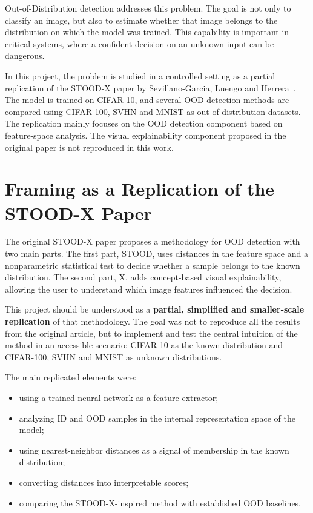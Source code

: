\documentclass[11pt,a4paper]{article}
\begin{document}
Out-of-Distribution detection addresses this problem.
The goal is not only to classify an image, but also to estimate whether that image belongs to the distribution on which the model was trained.
This capability is important in critical systems, where a confident decision on an unknown input can be dangerous.

In this project, the problem is studied in a controlled setting as a partial replication of the STOOD-X paper by Sevillano-Garcia, Luengo and Herrera~\cite{stoodx2025}.
The model is trained on CIFAR-10, and several OOD detection methods are compared using CIFAR-100, SVHN and MNIST as out-of-distribution datasets.
The replication mainly focuses on the OOD detection component based on feature-space analysis.
The visual explainability component proposed in the original paper is not reproduced in this work.

\section{Framing as a Replication of the STOOD-X Paper}

The original STOOD-X paper proposes a methodology for OOD detection with two main parts.
The first part, STOOD, uses distances in the feature space and a nonparametric statistical test to decide whether a sample belongs to the known distribution.
The second part, X, adds concept-based visual explainability, allowing the user to understand which image features influenced the decision.

This project should be understood as a \textbf{partial, simplified and smaller-scale replication} of that methodology.
The goal was not to reproduce all the results from the original article, but to implement and test the central intuition of the method in an accessible scenario: CIFAR-10 as the known distribution and CIFAR-100, SVHN and MNIST as unknown distributions.

The main replicated elements were:

\begin{itemize}
    \item using a trained neural network as a feature extractor;
    \item analyzing ID and OOD samples in the internal representation space of the model;
    \item using nearest-neighbor distances as a signal of membership in the known distribution;
    \item converting distances into interpretable scores;
    \item comparing the STOOD-X-inspired method with established OOD baselines.
\end{itemize}
\end{document}
